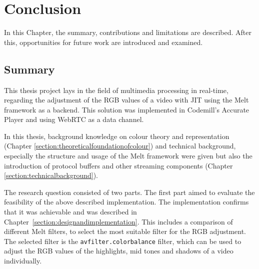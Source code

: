 \documentclass[../MasterThesis.tex]{subfiles}
\begin{document}
	
	
%
%
%
%
%
%
%
%
\newpage
\section{Conclusion} \label{section:conclusion}

In this Chapter, the summary, contributions and limitations are described. After this, opportunities for future work are introduced and examined.






\subsection{Summary} \label{subsection:summary}


This thesis project lays in the field of multimedia processing in real-time, regarding the adjustment of the RGB values of a video with JIT using the Melt framework as a backend. This solution was implemented in Codemill's Accurate Player and using WebRTC as a data channel.

In this thesis, background knowledge on colour theory and representation (Chapter \ref{section:theoreticalfoundationofcolour}) and technical background, especially the structure and usage of the Melt framework were given but also the introduction of protocol buffers and other streaming components (Chapter \ref{section:technicalbackground}).

The research question consisted of two parts. The first part aimed to evaluate the feasibility of the above described implementation. The implementation confirms that it was achievable and was described in Chapter~\ref{section:designandimplementation}. This includes a comparison of different Melt filters, to select the most suitable filter for the RGB adjustment. The selected filter is the \texttt{avfilter.colorbalance} filter, which can be used to adjust the RGB values of the highlights, mid tones and shadows of a video individually.
\end{document}
